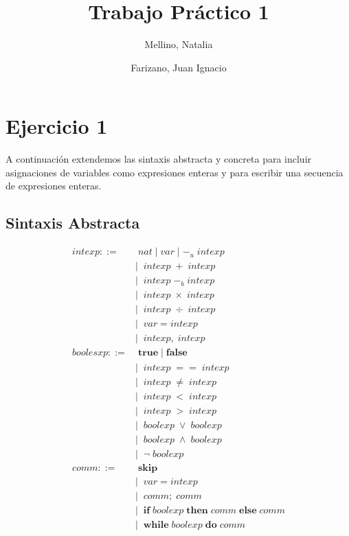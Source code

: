 \documentclass[11pt, fleqn]{article}
\title{Trabajo Práctico 1}
\author{Mellino, Natalia \and Farizano, Juan Ignacio}
\date{}
\begin{document}
\maketitle


\section*{Ejercicio 1}
A continuación extendemos las sintaxis abstracta y concreta para incluir asignaciones
de variables como expresiones enteras y para escribir una secuencia de expresiones enteras.

\subsection*{Sintaxis Abstracta}
\begin{align*}
intexp ::=& \; nat \; | \; var \; | \; -_u \; intexp \\
          &| \;\; intexp \; +  \; intexp \\
          &| \;\; intexp \; -_b  \; intexp \\
          &| \;\; intexp \; \times  \; intexp \\
          &| \;\; intexp \; \div  \; intexp \\
          &| \;\; var = intexp \\
          &| \;\; intexp, \; intexp \\
boolesxp ::=& \; \textbf{true} \; | \; \textbf{false} \\
            &| \;\; intexp \; ==  \; intexp \\
            &| \;\; intexp \; \neq  \; intexp \\
            &| \;\; intexp \; <  \; intexp \\
            &| \;\; intexp \; >  \; intexp \\
            &| \;\; boolexp \; \lor  \; boolexp \\
            &| \;\; boolexp \; \land  \; boolexp \\
            &| \;\; \neg \; boolexp \\
comm ::=& \; \textbf{skip} \\
        &| \;\; var = intexp \\
        &| \;\; comm; \; comm \\
        &| \;\; \textbf{if} \; boolexp \; \textbf{then} \; comm \; \textbf{else} \; comm \\
        &| \; \; \textbf{while} \; boolexp \; \textbf{do} \; comm
\end{align*}
\end{document}
